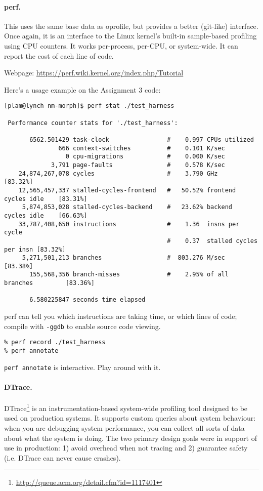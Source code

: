 \paragraph{perf.} This uses the same base data as oprofile, but provides a better
(git-like) interface. Once again, it is an interface to the Linux kernel's built-in
sample-based profiling using CPU counters. It works per-process, per-CPU, or system-wide.
It can report the cost of each line of code.

Webpage: \url{https://perf.wiki.kernel.org/index.php/Tutorial}

\noindent
Here's a usage example on the Assignment 3 code:
\begin{lstlisting}[basicstyle=\tiny]
[plam@lynch nm-morph]$ perf stat ./test_harness

 Performance counter stats for './test_harness':

       6562.501429 task-clock                #    0.997 CPUs utilized          
               666 context-switches          #    0.101 K/sec                  
                 0 cpu-migrations            #    0.000 K/sec                  
             3,791 page-faults               #    0.578 K/sec                  
    24,874,267,078 cycles                    #    3.790 GHz                     [83.32%]
    12,565,457,337 stalled-cycles-frontend   #   50.52% frontend cycles idle    [83.31%]
     5,874,853,028 stalled-cycles-backend    #   23.62% backend  cycles idle    [66.63%]
    33,787,408,650 instructions              #    1.36  insns per cycle        
                                             #    0.37  stalled cycles per insn [83.32%]
     5,271,501,213 branches                  #  803.276 M/sec                   [83.38%]
       155,568,356 branch-misses             #    2.95% of all branches         [83.36%]

       6.580225847 seconds time elapsed
\end{lstlisting} %

\noindent
perf can tell you which instructions are taking time, or which lines
of code; compile with {\tt -ggdb} to enable source code viewing.

\begin{lstlisting}
% perf record ./test_harness
% perf annotate
\end{lstlisting}

\noindent
{\tt perf annotate} is interactive. Play around with it.

\paragraph{DTrace.} 
DTrace\footnote{\url{http://queue.acm.org/detail.cfm?id=1117401}}\cite{Cantrill:2004:DIP:1247415.1247417} is an instrumentation-based
system-wide profiling tool designed to be used on production
systems. It supports custom queries about system behaviour: when you
are debugging system performance, you can collect all sorts of data
about what the system is doing. The two primary design goals were in
support of use in production: 1) avoid overhead when not tracing and
2) guarantee safety (i.e. DTrace can never cause crashes).


